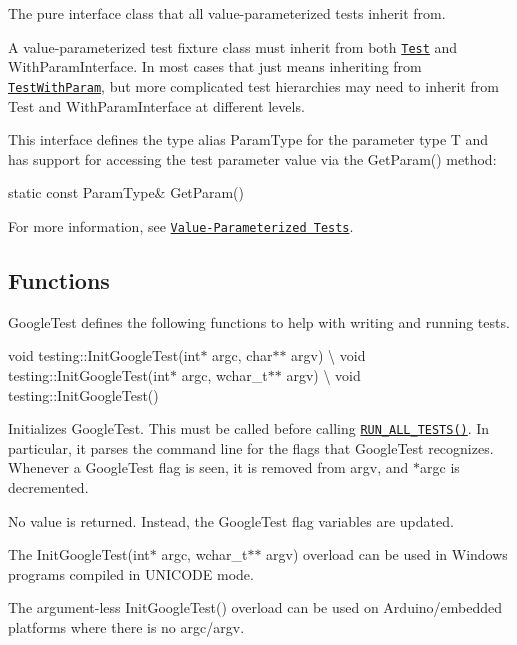 The pure interface class that all value-\/parameterized tests inherit from.

A value-\/parameterized test fixture class must inherit from both \href{#Test}{\tt {\ttfamily Test}} and {\ttfamily With\+Param\+Interface}. In most cases that just means inheriting from \href{#TestWithParam}{\tt {\ttfamily Test\+With\+Param}}, but more complicated test hierarchies may need to inherit from {\ttfamily Test} and {\ttfamily With\+Param\+Interface} at different levels.

This interface defines the type alias {\ttfamily Param\+Type} for the parameter type {\ttfamily T} and has support for accessing the test parameter value via the {\ttfamily Get\+Param()} method\+:


\begin{DoxyCode}
static const ParamType& GetParam()
\end{DoxyCode}


For more information, see \href{../advanced.md#value-parameterized-tests}{\tt Value-\/\+Parameterized Tests}.

\subsection*{Functions}

Google\+Test defines the following functions to help with writing and running tests.

{\ttfamily void testing\+::\+Init\+Google\+Test(int$\ast$ argc, char$\ast$$\ast$ argv)} \textbackslash{} {\ttfamily void testing\+::\+Init\+Google\+Test(int$\ast$ argc, wchar\+\_\+t$\ast$$\ast$ argv)} \textbackslash{} {\ttfamily void testing\+::\+Init\+Google\+Test()}

Initializes Google\+Test. This must be called before calling \href{#RUN_ALL_TESTS}{\tt {\ttfamily R\+U\+N\+\_\+\+A\+L\+L\+\_\+\+T\+E\+S\+T\+S()}}. In particular, it parses the command line for the flags that Google\+Test recognizes. Whenever a Google\+Test flag is seen, it is removed from {\ttfamily argv}, and {\ttfamily $\ast$argc} is decremented.

No value is returned. Instead, the Google\+Test flag variables are updated.

The {\ttfamily Init\+Google\+Test(int$\ast$ argc, wchar\+\_\+t$\ast$$\ast$ argv)} overload can be used in Windows programs compiled in {\ttfamily U\+N\+I\+C\+O\+DE} mode.

The argument-\/less {\ttfamily Init\+Google\+Test()} overload can be used on Arduino/embedded platforms where there is no {\ttfamily argc}/{\ttfamily argv}.

